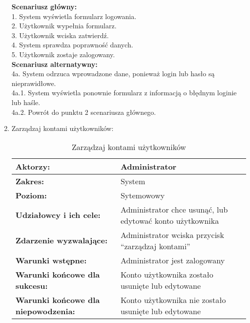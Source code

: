 \begin{enumerate}[label=(\Roman*)]
\textbf{Scenariusz główny:}\\
1. System wyświetla formularz logowania.\\
2. Użytkownik wypełnia formularz.\\
3. Użytkownik wciska zatwierdź.\\
4. System sprawdza poprawność danych.\\
5. Użytkownik zostaje zalogowany.\\
\textbf{Scenariusz alternatywny:}\\
4a. System odrzuca wprowadzone dane, ponieważ login lub hasło są nieprawidłowe.\\
4a.1. System wyświetla ponownie formularz z informacją o błędnym loginie lub haśle.\\
4a.2. Powrót do punktu 2 scenariusza głównego.\\

\item Zarządzaj kontami użytkowników:
	\begin{table}[H]
\centering
\caption{Zarządzaj kontami użytkowników}
\label{zku}
\begin{tabular}{|p{7cm}|p{7cm}|}
  \hline 
  \textbf{Aktorzy:} & Administrator\\
  \hline
  \textbf{Zakres:} & System \\
	\hline
  \textbf{Poziom:} & Sytemowowy \\
	\hline
  \textbf{Udziałowcy i ich cele: } & Administrator chce usunąć, lub edytować konto użytkownika
 \\
	\hline
  \textbf{Zdarzenie wyzwalające: } & Administrator wciska przycisk “zarządzaj kontami”
\\
	\hline
  \textbf{Warunki wstępne: } & Administrator jest zalogowany \\
	\hline
  \textbf{Warunki końcowe dla sukcesu:} & Konto użytkownika zostało usunięte lub edytowane\\
	\hline
  \textbf{Warunki końcowe dla niepowodzenia:} &  Konto użytkownika nie zostało usunięte lub edytowane \\
  \hline
\end{tabular} 
\end{table}


\end{enumerate}

